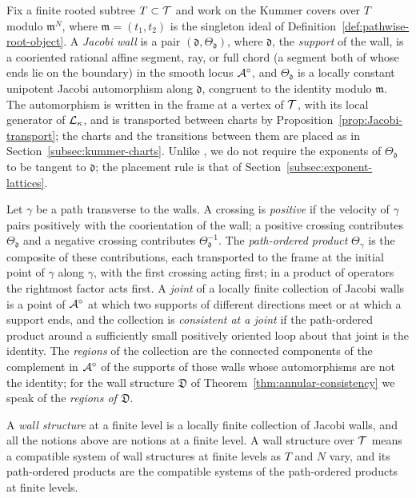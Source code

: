 \begin{definition}\label{def:Jacobi-wall}
Fix a finite rooted subtree $T\subset\mathcal T$ and work on the Kummer covers
over $T$ modulo $\mathfrak m^N$, where $\mathfrak m=(t_1,t_2)$ is the
singleton ideal of Definition~\ref{def:pathwise-root-object}.  A
\emph{Jacobi wall} is a pair $(\mathfrak d,\Theta_{\mathfrak d})$, where
$\mathfrak d$, the \emph{support} of the wall, is a cooriented rational
affine segment, ray, or full chord (a segment both of whose ends lie on the
boundary) in the smooth locus $\mathcal A^\circ$, and $\Theta_{\mathfrak d}$ is a
locally constant unipotent Jacobi automorphism along $\mathfrak d$,
congruent to the identity modulo $\mathfrak m$.  The automorphism is written
in the frame at a vertex of $\mathcal T$, with its local generator of
$\mathcal L_\kappa$, and is transported between charts by
Proposition~\ref{prop:Jacobi-transport}; the charts and the transitions
between them are placed as in Section~\ref{subsec:kummer-charts}.  Unlike
\cite{grosspandharipandesiebert2010,grosshackingkeel2015,grosssiebert2022},
we do not require the exponents of $\Theta_{\mathfrak d}$ to be tangent to
$\mathfrak d$; the placement rule is that of
Section~\ref{subsec:exponent-lattices}.

Let $\gamma$ be a path transverse to the walls.  A crossing is
\emph{positive} if the velocity of $\gamma$ pairs positively with the
coorientation of the wall; a positive crossing contributes
$\Theta_{\mathfrak d}$ and a negative crossing contributes
$\Theta_{\mathfrak d}^{-1}$.  The \emph{path-ordered product}
$\Theta_\gamma$ is the composite of these contributions, each transported to
the frame at the initial point of $\gamma$ along $\gamma$, with the first
crossing acting first; in a product of operators the rightmost factor acts
first.  A \emph{joint} of a locally finite collection of Jacobi walls is a
point of $\mathcal A^\circ$ at which two supports of different directions meet or
at which a support ends, and the collection is \emph{consistent at a joint}
if the path-ordered product around a sufficiently small positively oriented
loop about that joint is the identity.  The \emph{regions} of the collection
are the connected components of the complement in $\mathcal A^\circ$ of the
supports of those walls whose automorphisms are not the identity; for the
wall structure $\mathfrak D$ of Theorem~\ref{thm:annular-consistency} we
speak of the \emph{regions of $\mathfrak D$}.
\end{definition}

A \emph{wall structure} at a finite level is a locally finite collection of
Jacobi walls, and all the notions above are notions at a finite level.  A
wall structure over $\mathcal T$ means a compatible system of wall structures at
finite levels as $T$ and $N$ vary, and its path-ordered products are the
compatible systems of the path-ordered products at finite levels.

